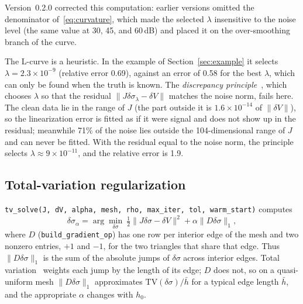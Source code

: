 \documentclass[11pt,a4paper]{article}
\newcommand{\code}[1]{\texttt{#1}}
\newcommand{\dsig}{\delta\sigma}
\newcommand{\dV}{\delta V}
\begin{document}
Version~0.2.0 corrected this computation: earlier versions omitted the
denominator of~\eqref{eq:curvature}, which made the selected $\lambda$
insensitive to the noise level (the same value at 30, 45, and 60\,dB) and
placed it on the over-smoothing branch of the curve.

The L-curve is a heuristic. In the example of Section~\ref{sec:example} it
selects $\lambda = 2.3\times10^{-9}$ (relative error 0.69), against an
error of 0.58 for the best $\lambda$, which can only be found when the truth
is known. The \emph{discrepancy principle}~\cite{Morozov1966}, which chooses
$\lambda$ so that the residual $\|J\dsig_\lambda-\dV\|$ matches the noise
norm, fails here. The clean data lie in the range of $J$ (the part outside
it is $1.6\times10^{-14}$ of $\|\dV\|$), so the linearization error is fitted
as if it were signal and does not show up in the residual; meanwhile 71\% of
the noise lies outside the 104-dimensional range of $J$ and can never be
fitted. With the residual equal to the noise norm, the principle selects
$\lambda\approx9\times10^{-11}$, and the relative error is 1.9.

\subsection{Total-variation regularization}

\code{tv\_solve(J, dV, alpha, mesh, rho, max\_iter, tol, warm\_start)}
computes
\begin{equation}\label{eq:tv}
  \dsig_\alpha = \arg\min_{\dsig}\ \tfrac12\|J\dsig-\dV\|^2 +
  \alpha\|D\dsig\|_1 ,
\end{equation}
where $D$ (\code{build\_gradient\_op}) has one row per interior edge of the
mesh and two nonzero entries, $+1$ and $-1$, for the two triangles that share
that edge. Thus $\|D\dsig\|_1$ is the sum of the absolute jumps of $\dsig$
across interior edges. Total variation~\cite{RudinOsherFatemi1992} weights
each jump by the length of its edge; $D$ does not, so on a quasi-uniform mesh
$\|D\dsig\|_1$ approximates $\mathrm{TV}(\dsig)/\bar h$ for a typical edge
length $\bar h$, and the appropriate $\alpha$ changes with $h_0$.
\end{document}
